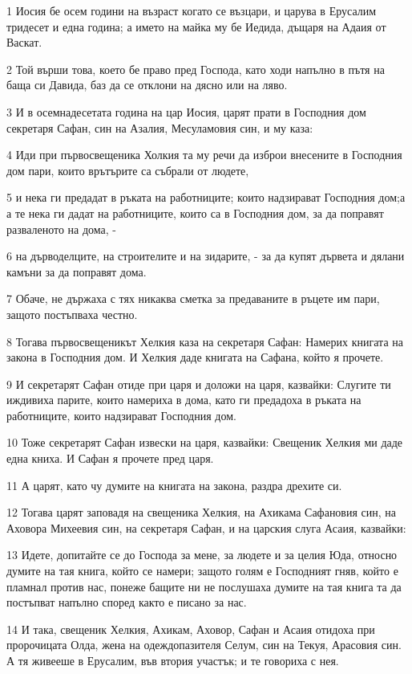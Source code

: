 \par 1 Иосия бе осем години на възраст когато се възцари, и царува в Ерусалим тридесет и една година; а името на майка му бе Иедида, дъщаря на Адаия от Васкат.
\par 2 Той върши това, което бе право пред Господа, като ходи напълно в пътя на баща си Давида, баз да се отклони на дясно или на ляво.
\par 3 И в осемнадесетата година на цар Иосия, царят прати в Господния дом секретаря Сафан, син на Азалия, Месуламовия син, и му каза:
\par 4 Иди при първосвещеника Холкия та му речи да изброи внесените в Господния дом пари, които врътърите са събрали от людете,
\par 5 и нека ги предадат в ръката на работниците; които надзирават Господния дом;а а те нека ги дадат на работниците, които са в Господния дом, за да поправят разваленото на дома, -
\par 6 на дърводелците, на строителите и на зидарите, - за да купят дървета и дялани камъни за да поправят дома.
\par 7 Обаче, не държаха с тях никаква сметка за предаваните в ръцете им пари, защото постъпваха честно.
\par 8 Тогава първосвещеникът Хелкия каза на секретаря Сафан: Намерих книгата на закона в Господния дом. И Хелкия даде книгата на Сафана, който я прочете.
\par 9 И секретарят Сафан отиде при царя и доложи на царя, казвайки: Слугите ти иждивиха парите, които намериха в дома, като ги предадоха в ръката на работниците, които надзирават Господния дом.
\par 10 Тоже секретарят Сафан извески на царя, казвайки: Свещеник Хелкия ми даде една книха. И Сафан я прочете пред царя.
\par 11 А царят, като чу думите на книгата на закона, раздра дрехите си.
\par 12 Тогава царят заповадя на свещеника Хелкия, на Ахикама Сафановия син, на Аховора Михеевия син, на секретаря Сафан, и на царския слуга Асаия, казвайки:
\par 13 Идете, допитайте се до Господа за мене, за людете и за целия Юда, относно думите на тая книга, който се намери; защото голям е Господният гняв, който е пламнал против нас, понеже бащите ни не послушаха думите на тая книга та да постъпват напълно според както е писано за нас.
\par 14 И така, свещеник Хелкия, Ахикам, Аховор, Сафан и Асаия отидоха при пророчицата Олда, жена на одеждопазителя Селум, син на Текуя, Арасовия син. А тя живееше в Ерусалим, във втория участък; и те говориха с нея.
